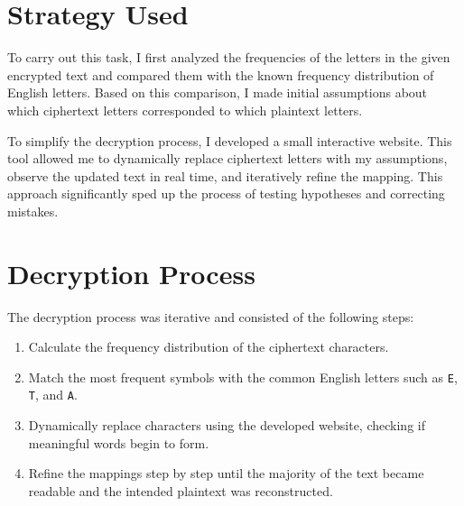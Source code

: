 \documentclass[12pt]{article}
\begin{document}
\section{Strategy Used}
To carry out this task, I first analyzed the frequencies of the letters in the given encrypted text 
and compared them with the known frequency distribution of English letters. Based on this 
comparison, I made initial assumptions about which ciphertext letters corresponded to which 
plaintext letters.  

To simplify the decryption process, I developed a small interactive website. This tool allowed me 
to dynamically replace ciphertext letters with my assumptions, observe the updated text in real 
time, and iteratively refine the mapping. This approach significantly sped up the process of 
testing hypotheses and correcting mistakes.

\section{Decryption Process}
The decryption process was iterative and consisted of the following steps:

\begin{enumerate}
    \item Calculate the frequency distribution of the ciphertext characters.
    \item Match the most frequent symbols with the common English letters such as \texttt{E}, 
    \texttt{T}, and \texttt{A}.
    \item Dynamically replace characters using the developed website, checking if meaningful words 
    begin to form.
    \item Refine the mappings step by step until the majority of the text became readable and the 
    intended plaintext was reconstructed.
\end{enumerate}
\end{document}
